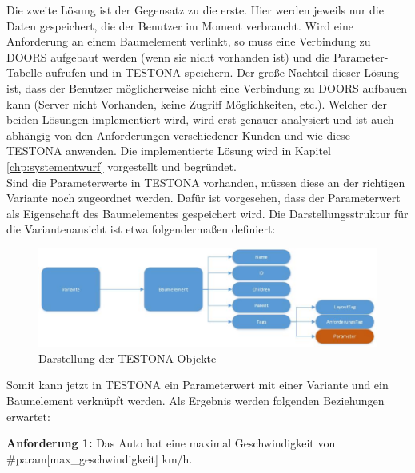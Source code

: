 Die zweite Lösung ist der Gegensatz zu die erste. Hier werden jeweils nur die Daten gespeichert, die der Benutzer im Moment verbraucht. Wird eine Anforderung an einem Baumelement verlinkt, so muss eine Verbindung zu DOORS aufgebaut werden (wenn sie nicht vorhanden ist) und die Parameter-Tabelle aufrufen und in TESTONA speichern. Der große Nachteil dieser Lösung ist, dass der Benutzer möglicherweise nicht eine Verbindung zu DOORS aufbauen kann (Server nicht Vorhanden, keine Zugriff Möglichkeiten, etc.). Welcher der beiden Lösungen implementiert wird, wird erst genauer analysiert und ist auch abhängig von den Anforderungen verschiedener Kunden und wie diese TESTONA anwenden. Die implementierte Lösung wird in Kapitel \ref{chp:systementwurf} vorgestellt und begründet.\\


Sind die Parameterwerte in TESTONA vorhanden, müssen diese an der richtigen Variante noch zugeordnet werden. Dafür ist vorgesehen, dass der Parameterwert als Eigenschaft des Baumelementes gespeichert wird. Die Darstellungsstruktur für die Variantenansicht ist etwa folgendermaßen definiert:\\

\begin{figure}[h!]
  \begin{center}
    \includegraphics[scale=0.5]{4_1_UML_Var_TreeItem_Properties.jpg}
  		  \caption{Darstellung der TESTONA Objekte}
     \label{ttn.depencyRulesEdit}
  \end{center}
\end{figure}


Somit kann jetzt in TESTONA ein Parameterwert mit einer Variante und ein Baumelement verknüpft werden. Als Ergebnis werden folgenden Beziehungen erwartet:

\begin{center}
\textbf{Anforderung 1: }Das Auto hat eine maximal Geschwindigkeit von \#param[max\_geschwindigkeit] km/h.
\end{center}

